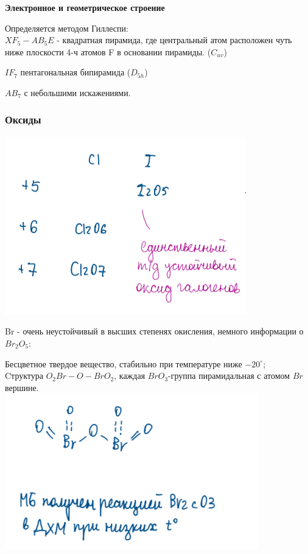 \documentclass[14pt,a4paper]{scrartcl}
\begin{document}
\textbf{Электронное и геометрическое строение}

Определяется методом Гиллеспи:\\

$XF_5 - AB_5E$ - квадратная пирамида, где центральный атом расположен чуть ниже плоскости 4-ч атомов F в основании пирамиды. ($C_{uv}$)

$IF_7$ пентагональная бипирамида ($D_{5h}$)

$AB_7$ с небольшими искажениями.

\subsubsection{Оксиды}
\includegraphics{5v1.png}

Br - очень неустойчивый в высших степенях окисления, немного информации о $Br_2O_5$:

Бесцветное твердое вещество, стабильно при температуре ниже $-20^{\circ}$;\\
Cтруктура $O_2Br-O-BrO_2$,  каждая $BrO_3$-группа пирамидальная с атомом $Br$  вершине.\\
\includegraphics{5v2.png}
\end{document}
